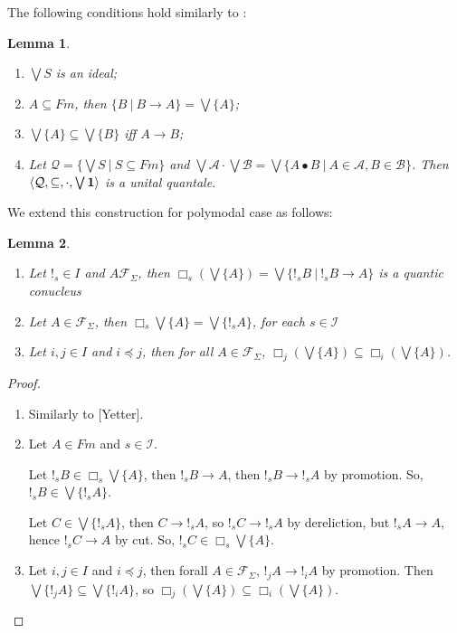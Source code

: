 \documentclass[a4paper]{article}
\theoremstyle{defin}
\theoremstyle{theorem}
\theoremstyle{prop}
\theoremstyle{lemma}
\newtheorem{lemma}{Lemma}
\theoremstyle{ex}
\theoremstyle{col}
\begin{document}
The following conditions hold similarly to \cite{Gurr}:

\begin{lemma}
$ $

  \begin{enumerate}
  \item $\bigvee S$ is an ideal;
  \item $A \subseteq Fm$, then $\{ B \: | \: B \rightarrow A \} = \bigvee \{ A \}$;
  \item $\bigvee \{ A \} \subseteq \bigvee \{ B \}$ iff $A \rightarrow B$;
  \item Let $\mathcal{Q} = \{ \bigvee S \: | \: S \subseteq Fm \}$ and $\bigvee \mathcal{A} \cdot \bigvee \mathcal{B} =
  \bigvee \{ A \bullet B \: | \: A \in \mathcal{A}, B \in \mathcal{B} \}$.
  Then $\langle \mathcal{Q}, \subseteq, \cdot, \bigvee{{\bf 1}}\rangle$ is a unital quantale.
  \end{enumerate}
\end{lemma}

We extend this construction for polymodal case as follows:

\begin{lemma}
  $ $

\begin{enumerate}
\item Let $!_s \in I$ and $A \mathcal{F}_{\Sigma}$, then $\Box_s (\bigvee \{ A \}) = \bigvee \{ !_s B \: | \: !_s B \rightarrow A \}$ is a quantic conucleus
\item Let $A \in \mathcal{F}_{\Sigma}$, then $\Box_s \bigvee \{ A \} = \bigvee \{ !_s A \}$, for each $s \in \mathcal{I}$
\item  Let $i, j \in I$ and $i \preceq j$, then for all $A \in \mathcal{F}_{\Sigma}$, $\Box_j (\bigvee \{ A \}) \subseteq \Box_i (\bigvee \{ A \})$.
\end{enumerate}

\end{lemma}

\begin{proof}
$ $

\begin{enumerate}
\item Similarly to [Yetter].
\item Let $A \in Fm$ and $s \in \mathcal{I}$.

Let $!_s B \in \Box_s \bigvee \{ A \}$, then $!_s B \rightarrow A$, then $!_s B \rightarrow !_s A$
by promotion. So, $!_s B \in \bigvee \{ !_s A \}$.

Let $C \in \bigvee \{ !_s A \}$, then $C \rightarrow !_s A$, so $!_s C \rightarrow !_s A$ by dereliction, but $!_s A \rightarrow A$, hence $!_s C \rightarrow A$ by cut. So, $!_s C \in \Box_s \bigvee \{ A \}$.
\item   Let $i, j \in I$ and $i \preceq j$, then forall $A \in \mathcal{F}_{\Sigma}$, $!_j A \rightarrow !_i A$ by promotion.
  Then $\bigvee \{ !_j A \} \subseteq \bigvee \{ !_i A \}$, so $\Box_j (\bigvee \{ A \}) \subseteq \Box_i (\bigvee \{ A \})$.
\end{enumerate}
\end{proof}
\end{document}

